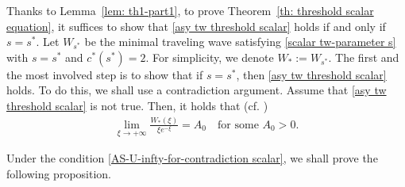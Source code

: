 \documentclass[11pt,a4paper]{article}
\numberwithin{equation}{section}
\numberwithin{figure}{section}
\newcommand\bea{\begin{eqnarray}}
\newcommand\eea{\end{eqnarray}}
\newcommand\beaa{\begin{eqnarray*}}
\newcommand\eeaa{\end{eqnarray*}}
\begin{document}
Thanks to Lemma~\ref{lem: th1-part1}, to prove Theorem~\ref{th: threshold scalar equation}, it suffices to show that
\eqref{asy tw threshold scalar} holds if and only if $s=s^*$.
Let $W_{s^*}$ be the minimal traveling wave satisfying \eqref{scalar tw-parameter s} with $s=s^*$
and $c^*(s^*)=2$. For simplicity, we denote $W_*:=W_{s^*}$.
The first and the most involved step is to show that if $s=s^*$, then \eqref{asy tw threshold scalar} holds.
To do this, we shall use a contradiction argument.
Assume that \eqref{asy tw threshold scalar} is not true. Then, %
it holds that (cf. \cite{Aronson Weinberger})
\bea\label{AS-U-infty-for-contradiction scalar}
\lim_{\xi\rightarrow+\infty}\frac{W_{*}(\xi)}{\xi e^{-\xi}}=A_0\quad \mbox{for some $A_0>0$.}
\eea



Under the condition \eqref{AS-U-infty-for-contradiction scalar},
we shall prove the following proposition.
\end{document}
